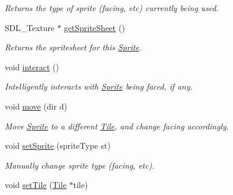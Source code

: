 \begin{DoxyCompactItemize}
\begin{DoxyCompactList}\small\item\em Returns the type of sprite (facing, etc) currently being used. \end{DoxyCompactList}\item 
S\+D\+L\+\_\+\+Texture $\ast$ \hyperlink{class_sprite_abec247d2cd9396834344c3cfe81eddc1}{get\+Sprite\+Sheet} ()\hypertarget{class_sprite_abec247d2cd9396834344c3cfe81eddc1}{}\label{class_sprite_abec247d2cd9396834344c3cfe81eddc1}

\begin{DoxyCompactList}\small\item\em Returns the spritesheet for this \hyperlink{class_sprite}{Sprite}. \end{DoxyCompactList}\item 
void \hyperlink{class_sprite_a5ca2adc18eeb5290160a5d035992d937}{interact} ()\hypertarget{class_sprite_a5ca2adc18eeb5290160a5d035992d937}{}\label{class_sprite_a5ca2adc18eeb5290160a5d035992d937}

\begin{DoxyCompactList}\small\item\em Intelligently interacts with \hyperlink{class_sprite}{Sprite} being faced, if any. \end{DoxyCompactList}\item 
void \hyperlink{class_sprite_a376d5d03359afd9cdfc6e0b07f22ff37}{move} (dir d)\hypertarget{class_sprite_a376d5d03359afd9cdfc6e0b07f22ff37}{}\label{class_sprite_a376d5d03359afd9cdfc6e0b07f22ff37}

\begin{DoxyCompactList}\small\item\em Move \hyperlink{class_sprite}{Sprite} to a different \hyperlink{class_tile}{Tile}, and change facing accordingly. \end{DoxyCompactList}\item 
void \hyperlink{class_sprite_aa9d0dd6123988d79c94a18f3e404d8d7}{set\+Sprite} (sprite\+Type st)\hypertarget{class_sprite_aa9d0dd6123988d79c94a18f3e404d8d7}{}\label{class_sprite_aa9d0dd6123988d79c94a18f3e404d8d7}

\begin{DoxyCompactList}\small\item\em Manually change sprite type (facing, etc). \end{DoxyCompactList}\item 
void \hyperlink{class_sprite_adc65cbc668aa239bc359156bfb5e3f89}{set\+Tile} (\hyperlink{class_tile}{Tile} $\ast$tile)\hypertarget{class_sprite_adc65cbc668aa239bc359156bfb5e3f89}{}\label{class_sprite_adc65cbc668aa239bc359156bfb5e3f89}


\end{DoxyCompactItemize}
